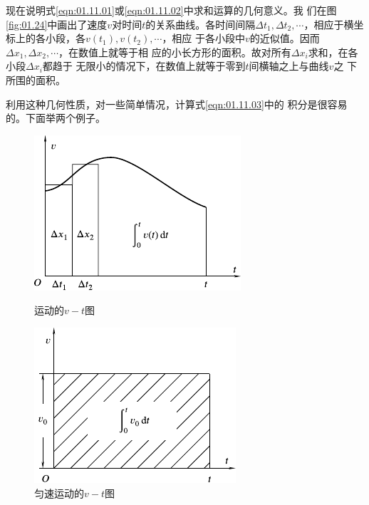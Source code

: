 现在说明式\eqref{eqn:01.11.01}或\eqref{eqn:01.11.02}中求和运算的几何意义。我
们在图\ref{fig:01.24}中画出了速度$v$对时间$t$的关系曲线。各时间间隔$\Delta t_1 , \Delta t_2 , \cdots$，相应于横坐标上的各小段，各$v\left(t_1\right) , v\left(t_2\right) , \cdots$，相应
于各小段中$ v $的近似值。因而$\Delta x_1 , \Delta x_2 , \cdots$，在数值上就等于相
应的小长方形的面积。故对所有$\Delta x_i$求和，在各小段$\Delta x_i$都趋于
无限小的情况下，在数值上就等于零到$t$间横轴之上与曲线$v$之
下所围的面积。

利用这种几何性质，对一些简单情况，计算式\eqref{eqn:01.11.03}中的
积分是很容易的。下面举两个例子。

\begin{figure}[!h]
  \begin{minipage}[b]{14em}
    \centering
    \includegraphics[width=0.8\linewidth]{figure/fig01.24}
    \caption{运动的$v-t$图}
    \label{fig:01.24}
  \end{minipage}\hfill
  \begin{minipage}[b]{14em}
    \centering
    \includegraphics[width=0.8\linewidth]{figure/fig01.25}
    \caption{匀速运动的$v-t$图}
    \label{fig:01.25}
  \end{minipage}
\end{figure}

